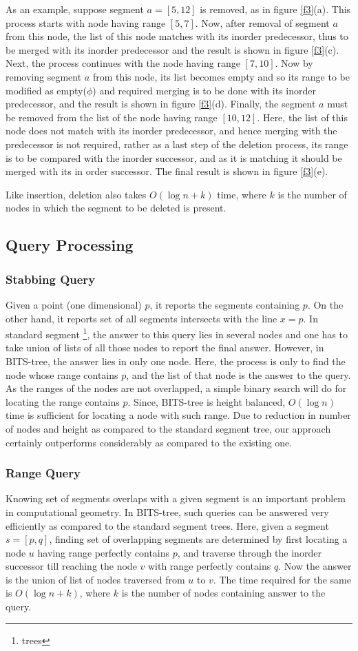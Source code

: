 \documentclass{article}
\begin{document}
As an example, suppose segment $a=[5,12]$ is removed, as in figure \ref{f3}(a).  This process starts with node having range $[5,7]$. Now, after removal of segment $a$ from this node, the list of this node matches with its inorder predecessor, thus to be merged with its inorder predecessor and the result is shown in figure \ref{f3}(c). Next, the process continues with the node having range $[7,10]$. Now by removing segment $a$ from this node, its list becomes empty and so its range to be modified as empty($\phi$) and required merging is to be done with its inorder predecessor, and the result is shown in figure \ref{f3}(d). Finally, the segment $a$ must be removed from the list of the node having range $[10,12]$. Here, the list of this node does not match with its inorder predecessor, and hence merging with the predecessor is not required, rather as a last step of the deletion process, its range is to be compared with the inorder successor, and as it is matching it should be merged with its in order successor. The final result is shown in figure \ref{f3}(e).\
\par
Like insertion, deletion also takes $O(\log n + k)$ time, where $k$ is the number of nodes in which the segment to be deleted is present. 
\subsection{Query Processing} 
\subsubsection{Stabbing Query}
Given a point (one dimensional) $p$, it reports the segments containing $p$. On the other hand, it reports set of all segments intersects with the line $x=p$. In standard segment \footnote{trees}, the answer to this query lies in several nodes and one has to take union of lists of all those nodes to report the final answer. However, in BITS-tree, the answer lies in only one node. Here, the process is only to find the node whose range contains $p$, and the list of that node is the answer to the query. As the ranges of the nodes are not overlapped, a simple binary search will do for locating the range contains $p$. Since, BITS-tree is height balanced, $O(\log n)$ time is sufficient for locating a node with such range. Due to reduction in number of nodes and height as compared to the standard segment tree, our approach certainly outperforms considerably as compared to the existing one.
\subsubsection{Range Query}
Knowing set of segments overlaps with a given segment is an important problem in computational geometry\cite{bcko}. In BITS-tree, such queries can be answered very efficiently as compared to the standard segment trees. Here, given a segment $s=[p,q]$, finding set of overlapping segments are determined by first locating a node $u$ having range perfectly contains $p$, and traverse through the inorder successor till reaching the node $v$ with range perfectly contains $q$. Now the answer is the union of list of nodes traversed from $u$ to $v$. The time required for the same is $O(\log n +k)$, where $k$ is the number of nodes containing answer to the query.
\end{document}
